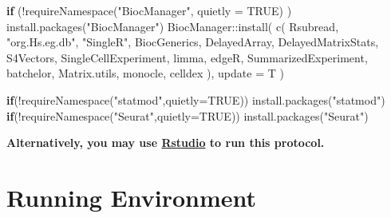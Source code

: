 \documentclass[
]{book}
\newenvironment{Shaded}{\begin{snugshade}}{\end{snugshade}}
\newcommand{\AttributeTok}[1]{\textcolor[rgb]{0.77,0.63,0.00}{#1}}
\newcommand{\ConstantTok}[1]{\textcolor[rgb]{0.00,0.00,0.00}{#1}}
\newcommand{\ControlFlowTok}[1]{\textcolor[rgb]{0.13,0.29,0.53}{\textbf{#1}}}
\newcommand{\FunctionTok}[1]{\textcolor[rgb]{0.00,0.00,0.00}{#1}}
\newcommand{\NormalTok}[1]{#1}
\newcommand{\SpecialCharTok}[1]{\textcolor[rgb]{0.00,0.00,0.00}{#1}}
\newcommand{\StringTok}[1]{\textcolor[rgb]{0.31,0.60,0.02}{#1}}
\begin{document}
\begin{Shaded}
\begin{Highlighting}[]
\ControlFlowTok{if}\NormalTok{ (}\SpecialCharTok{!}\FunctionTok{requireNamespace}\NormalTok{(}\StringTok{"BiocManager"}\NormalTok{, }\AttributeTok{quietly =} \ConstantTok{TRUE}\NormalTok{)}
\NormalTok{)}
\FunctionTok{install.packages}\NormalTok{(}\StringTok{"BiocManager"}\NormalTok{)}
\NormalTok{BiocManager}\SpecialCharTok{::}\FunctionTok{install}\NormalTok{(}
  \FunctionTok{c}\NormalTok{(}
    \StringTok{\textquotesingle{}Rsubread\textquotesingle{}}\NormalTok{,}
    \StringTok{"org.Hs.eg.db"}\NormalTok{,}
    \StringTok{"SingleR"}\NormalTok{,}
    \StringTok{\textquotesingle{}BiocGenerics\textquotesingle{}}\NormalTok{,}
    \StringTok{\textquotesingle{}DelayedArray\textquotesingle{}}\NormalTok{,}
    \StringTok{\textquotesingle{}DelayedMatrixStats\textquotesingle{}}\NormalTok{,}
    \StringTok{\textquotesingle{}S4Vectors\textquotesingle{}}\NormalTok{,}
    \StringTok{\textquotesingle{}SingleCellExperiment\textquotesingle{}}\NormalTok{,}
    \StringTok{\textquotesingle{}limma\textquotesingle{}}\NormalTok{,}
    \StringTok{\textquotesingle{}edgeR\textquotesingle{}}\NormalTok{,}
    \StringTok{\textquotesingle{}SummarizedExperiment\textquotesingle{}}\NormalTok{,}
    \StringTok{\textquotesingle{}batchelor\textquotesingle{}}\NormalTok{,}
    \StringTok{\textquotesingle{}Matrix.utils\textquotesingle{}}\NormalTok{,}
    \StringTok{\textquotesingle{}monocle\textquotesingle{}}\NormalTok{,}
    \StringTok{\textquotesingle{}celldex\textquotesingle{}}
\NormalTok{  ),}
  \AttributeTok{update =}\NormalTok{ T}
\NormalTok{)}

\ControlFlowTok{if}\NormalTok{(}\SpecialCharTok{!}\FunctionTok{requireNamespace}\NormalTok{(}\StringTok{"statmod"}\NormalTok{,}\AttributeTok{quietly=}\ConstantTok{TRUE}\NormalTok{))}
  \FunctionTok{install.packages}\NormalTok{(}\StringTok{"statmod"}\NormalTok{)}
\ControlFlowTok{if}\NormalTok{(}\SpecialCharTok{!}\FunctionTok{requireNamespace}\NormalTok{(}\StringTok{"Seurat"}\NormalTok{,}\AttributeTok{quietly=}\ConstantTok{TRUE}\NormalTok{))}
  \FunctionTok{install.packages}\NormalTok{(}\StringTok{"Seurat"}\NormalTok{)}
\end{Highlighting}
\end{Shaded}

\textbf{Alternatively, you may use \href{https://rstudio.com/}{Rstudio} to run this protocol.}

\hypertarget{running-environment}{%
\chapter{Running Environment}\label{running-environment}}
\end{document}

